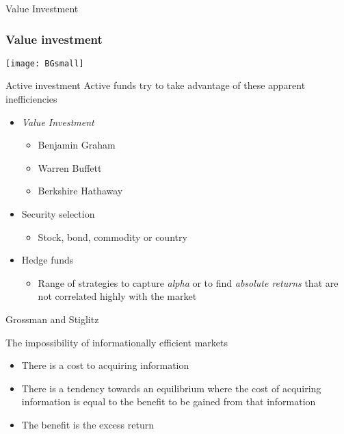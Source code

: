 \documentclass[14pt,xcolor=pdftex,dvipsnames,table]{beamer}\usepackage[]{graphicx}\usepackage[]{color}
\begin{document}
\begin{frame}{Value Investment}
\frametitle{Value investment}
\begin{center}
\texttt{[image: BGsmall]}
\end{center}
\end{frame}

\begin{frame}{Active investment}
Active funds try to take advantage of these apparent inefficiencies
\begin{itemize}[<+-| alert@+>]
\pause
\item \emph{Value Investment}
\begin{itemize}
\item Benjamin Graham
\item Warren Buffett
\item Berkshire Hathaway
\end{itemize}
\item Security selection
\begin{itemize}
\item Stock, bond, commodity or country
\end{itemize}
\item Hedge funds
\begin{itemize}
\item Range of strategies to capture \emph{alpha} or to find \emph{absolute returns} that are not correlated highly with the market 
\end{itemize}
\end{itemize}
\end{frame}

\begin{frame}{Grossman and Stiglitz}
\begin{block}{}
The impossibility of informationally efficient markets
\end{block}
\begin{itemize}[<+-| alert@+>]
\pause 
\item There is a cost to acquiring information
\item There is a tendency towards an equilibrium where the cost of acquiring information is equal to the benefit to be gained from that information
\item The benefit is the excess return
\end{itemize}
\end{frame}
\end{document}
